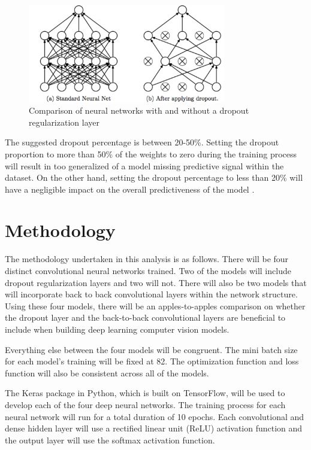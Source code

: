 \documentclass[5p,authoryear]{elsarticle}
\begin{document}
\begin{figure}[!h] 
    \centering
	\includegraphics[width=3.4in]{figures/Dropout.png}
	\caption[]{Comparison of neural networks with and without a dropout regularization layer} 
	\label{dropout} 
\end{figure}


The suggested dropout percentage is between 20-50\%. Setting the dropout proportion to more than 50\% of the weights to zero during the training process will result in too generalized of a model missing predictive signal within the dataset. On the other hand, setting the dropout percentage to less than 20\% will have a negligible impact on the overall predictiveness of the model \citep{brownlee}.    

\section{Methodology}

The methodology undertaken in this analysis is as follows. There will be four distinct convolutional neural networks trained. Two of the models will include dropout regularization layers and two will not. There will also be two models that will incorporate back to back convolutional layers within the network structure. Using these four models, there will be an apples-to-apples comparison on whether the dropout layer and the back-to-back convolutional layers are beneficial to include when building deep learning computer vision models. 

Everything else between the four models will be congruent. The mini batch size for each model’s training will be fixed at 82. The optimization function and loss function will also be consistent across all of the models. 

The Keras package in Python, which is built on TensorFlow, will be used to develop each of the four deep neural networks. The training process for each neural network will run for a total duration of 10 epochs. Each convolutional and dense hidden layer will use a rectified linear unit (ReLU) activation function and the output layer will use the softmax activation function.
\end{document}

